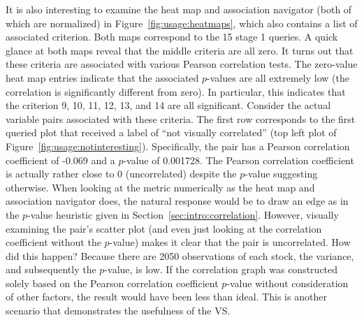 It is also interesting to examine the heat map and association navigator (both 
of which are normalized) in Figure~\ref{fig:usage:heatmaps}, which also 
contains a list of associated criterion. Both maps correspond to the 15 stage 1 
queries. A quick glance at both maps reveal that 
the middle criteria are all zero. It turns out that these criteria 
are associated with various Pearson correlation tests. 
The zero-value heat map entries indicate that the associated $p$-values are all 
extremely low (the correlation is significantly different from zero). In 
particular, this indicates that the criterion 9, 10, 11, 12, 13, and 14 are 
all significant. Consider the actual variable pairs associated with these 
criteria. The first row corresponds to the first queried plot that received a 
label of ``not visually correlated'' (top left plot of 
Figure~\ref{fig:usage:notinteresting}). Specifically, the pair has a Pearson 
correlation coefficient of -0.069 and a $p$-value of 0.001728. The Pearson 
correlation coefficient is actually rather close to 0 
(uncorrelated) despite the $p$-value suggesting otherwise. When looking at the 
metric numerically as the heat map and association navigator does, the natural 
response would be to draw an edge as in the $p$-value heuristic given in 
Section~\ref{sec:intro:correlation}. 
However, visually examining the pair's scatter plot (and even just looking at 
the correlation coefficient without the $p$-value) makes it clear that the pair 
is uncorrelated. How did this happen? Because there are 2050 observations of 
each stock, the variance, and subsequently the $p$-value, is low. 
If the correlation graph was constructed solely based on 
the Pearson correlation coefficient $p$-value without consideration of other 
factors, the result would have been less than ideal. This is another scenario 
that demonstrates the usefulness of the VS.

